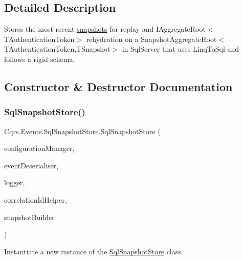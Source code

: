 \subsection{Detailed Description}
Stores the most recent \hyperlink{}{snapshots} for replay and I\+Aggregate\+Root$<$\+T\+Authentication\+Token$>$ rehydration on a Snapshot\+Aggregate\+Root$<$\+T\+Authentication\+Token,\+T\+Snapshot$>$ in Sql\+Server that uses Linq\+To\+Sql and follows a rigid schema. 



\subsection{Constructor \& Destructor Documentation}
\mbox{\label{classCqrs_1_1Events_1_1SqlSnapshotStore_a9910cd3866ca4f226d5258479deefd12_a9910cd3866ca4f226d5258479deefd12}} 
\subsubsection{\texorpdfstring{Sql\+Snapshot\+Store()}{SqlSnapshotStore()}}
{\footnotesize\ttfamily Cqrs.\+Events.\+Sql\+Snapshot\+Store.\+Sql\+Snapshot\+Store (\begin{DoxyParamCaption}\item[{\hyperlink{interfaceCqrs_1_1Configuration_1_1IConfigurationManager}{I\+Configuration\+Manager}}]{configuration\+Manager,  }\item[{\hyperlink{interfaceCqrs_1_1Events_1_1ISnapshotDeserialiser}{I\+Snapshot\+Deserialiser}}]{event\+Deserialiser,  }\item[{I\+Logger}]{logger,  }\item[{I\+Correlation\+Id\+Helper}]{correlation\+Id\+Helper,  }\item[{\hyperlink{interfaceCqrs_1_1Events_1_1ISnapshotBuilder}{I\+Snapshot\+Builder}}]{snapshot\+Builder }\end{DoxyParamCaption})}



Instantiate a new instance of the \hyperlink{classCqrs_1_1Events_1_1SqlSnapshotStore}{Sql\+Snapshot\+Store} class. 



